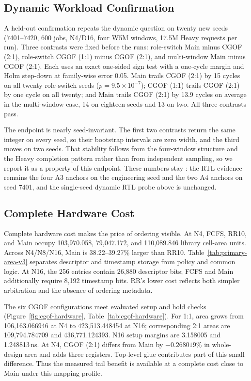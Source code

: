 \subsection{Dynamic Workload Confirmation}

A held-out confirmation repeats the dynamic question on twenty new seeds (7401--7420, 600  jobs, N4/D16, four W5M windows, 17.5M Heavy requests per run). Three contrasts were fixed before the runs: role-switch Main minus CGOF (2:1), role-switch CGOF (1:1) minus CGOF (2:1), and multi-window Main minus CGOF (2:1). Each uses an exact one-sided sign test with a one-cycle margin and Holm step-down at family-wise error 0.05. Main trails CGOF (2:1) by 15 cycles on all twenty role-switch seeds ($p=9.5\times10^{-7}$); CGOF (1:1) trails CGOF (2:1) by one cycle on all twenty; and Main trails CGOF (2:1) by 13.9 cycles on average in the multi-window case, 14 on eighteen seeds and 13 on two. All three contrasts pass.

The endpoint is nearly seed-invariant. The first two contrasts return the same integer on every seed, so their bootstrap intervals are zero width, and the third moves on two seeds. That stability follows from the four-window structure and the Heavy completion pattern rather than from independent sampling, so we report it as a property of this endpoint. These numbers stay : the RTL evidence remains the four A3 anchors on the engineering seed and the two A4 anchors on seed 7401, and the single-seed dynamic RTL probe above is unchanged.

\subsection{Complete Hardware Cost}

Complete hardware cost makes the price of ordering visible. At N4, FCFS, RR10, and Main occupy 103,970.058, 79,047.172, and 110,089.846 library cell-area units. Across N4/N8/N16, Main is 38.22--39.27\% larger than RR10. Table~\ref{tab:primary-area-v3} separates descriptor and timestamp storage from policy and common logic. At N16, the 256 entries contain 26,880 descriptor bits; FCFS and Main additionally require 8,192 timestamp bits. RR's lower cost reflects both simpler arbitration and the absence of ordering metadata.

The six CGOF configurations meet evaluated setup and hold checks (Figure~\ref{fig:cgof-hardware}, Table~\ref{tab:cgof-hardware}). For 1:1, area grows from 106,163.066946 at N4 to 423,513.448454 at N16; corresponding 2:1 areas are 109,794.784709 and 436,771.124393. N16 setup margins are 3.158005 and 1.248813\,ns. At N4, CGOF (2:1) differs from Main by $-0.268019\%$ in whole-design area and adds three registers. Top-level glue contributes part of this small difference. Thus the measured tail benefit is available at a complete cost close to Main under this mapping profile.

